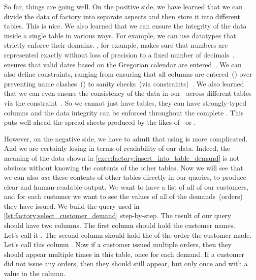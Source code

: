 %
%
%
So far, things are going well.
On the positive side, we have learned that we can divide the data of factory into separate aspects and then store it into different tables.
This is nice.
We also learned that we can ensure the integrity of the data inside a single table in various ways.
For example, we can use datatypes that strictly enforce their domains.
, for example, makes sure that numbers are represented exactly without loss of precision to a fixed number of decimals~\cite{PGDG:PD:NT}.
 ensures that valid dates based on the Gregorian calendar are entered~\cite{PGDG:PD:HU,G1582IG}.
We can also define constraints, ranging from ensuring that all columns are entered~() over preventing name clashes~() to sanity checks~(via  constraints)~\cite{PGDG:PD:C}.
We also learned that we can even ensure the consistency of the data in our \db\ across different tables via the  constraint~\cite{PGDG:PD:FK}.
So we cannot just have tables, they can have strongly-typed columns and the data integrity can be enforced throughout the complete \db.
This puts  well ahead the spread sheets produced by the likes of \microsoftExcel\ or \libreofficeCalc.

However, on the negative side, we have to admit that using  is more complicated.
And we are certainly losing in terms of readability of our data.
Indeed, the meaning of the  data shown in \cref{exec:factory:insert_into_table_demand} is not obvious without knowing the contents of the other tables.
Now we will see that we can also \emph{use} these contents of other tables directly in our queries, to produce clear and human-readable output.%
%
%
%
We want to have a list of all of our customers, and for each customer we want to see the  values of all of the demands~(orders) they have issued.
We build the query used in \cref{lst:factory:select_customer_demand} step-by-step.
The result of our query should have two columns.
The first column should hold the customer names.
Let's call it .
The second column should hold the  of the order the customer made.
Let's call this column .
Now if a customer issued multiple orders, then they should appear multiple times in this table, once for each demand.
If a customer did not issue any orders, then they should still appear, but only once and with a  value in the  column.

